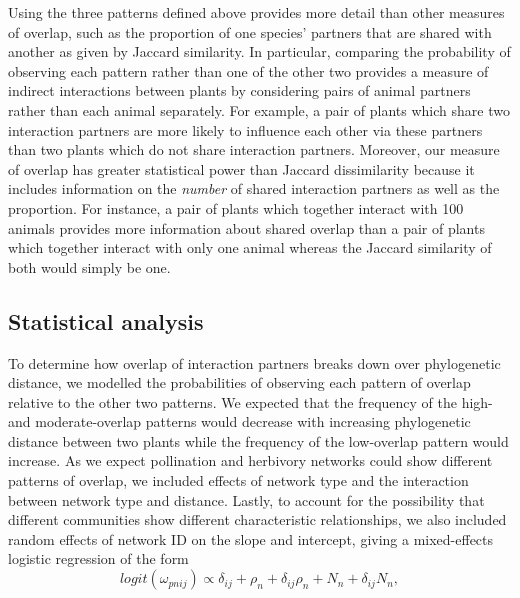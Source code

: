 \documentclass[12pt]{article}
\begin{document}
\begin{spacing}{1.5}
  Using the three patterns defined above provides more detail than other measures of overlap,
  such as the proportion of one species' partners that are shared with
  another as given by Jaccard similarity. In particular, comparing the probability of observing each pattern
  rather than one of the other two provides a measure of indirect
  interactions between plants by considering pairs of animal partners rather
  than each animal separately. For example, a pair of plants which share 
  two interaction partners are more likely to influence each other via these partners
  than two plants which do not share interaction partners. Moreover, our measure
  of overlap has greater statistical power than Jaccard dissimilarity because
  it includes information on the \emph{number} of shared interaction partners as
  well as the proportion. For instance, a pair of plants which together interact
  with 100 animals provides more information about shared overlap than a pair of
  plants which together interact with only one animal whereas the Jaccard similarity
  of both would simply be one.


\subsection*{Statistical analysis}

  To determine how overlap of interaction partners
  breaks down over phylogenetic distance,
  we modelled the probabilities of observing each pattern
  of overlap relative to the other two patterns.
  We expected that the frequency of the high- and moderate-overlap 
  patterns would decrease with increasing phylogenetic distance
  between two plants while the frequency of the low-overlap pattern would
  increase. As we expect pollination and herbivory networks could 
  show different patterns of overlap, we included effects of network 
  type and the interaction between network type and distance. Lastly, to
  account for the possibility that different communities show different
  characteristic relationships, we also included random effects of network ID on the slope 
  and intercept, giving a mixed-effects logistic regression of the form
  \begin{equation}
  logit(\omega_{pnij}) \propto \delta_{ij} + \rho_{n} + \delta_{ij}\rho_{n} + N_{n} + \delta_{ij}N_{n} ,
  \label{networklevel}
  \end{equation}


\end{spacing}
\end{document}
